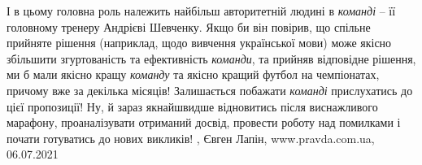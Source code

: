 І в цьому головна роль належить найбільш авторитетній людині в \emph{команді} –
її головному тренеру Андрієві Шевченку. Якщо би він повірив, що спільне
прийняте рішення (наприклад, щодо вивчення української мови) може якісно
збільшити згуртованість та ефективність \emph{команди}, та прийняв відповідне
рішення, ми б мали якісно кращу \emph{команду} та якісно кращий футбол на
чемпіонатах, причому вже за декілька місяців!  Залишається побажати
\emph{команді} прислухатись до цієї пропозиції! Ну, й зараз якнайшвидше
відновитись після виснажливого марафону, проаналізувати отриманий досвід,
провести роботу над помилками і почати готуватись до нових викликів!
, 
Євген Лапін, www.pravda.com.ua, 06.07.2021
